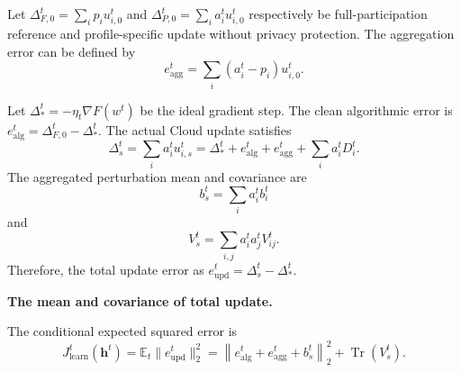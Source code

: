 \documentclass[5p,times]{elsarticle}
\theoremstyle{plain}
\theoremstyle{definition}
\theoremstyle{remark}
\begin{document}
Let \(\Delta_{F,0}^t=\sum_i p_i u_{i,0}^t\)
and
\(\Delta_{P,0}^t=\sum_i a_i^t u_{i,0}^t\) respectively be 
full-participation reference and 
profile-specific update
without privacy protection.
The aggregation error can be defined by
\begin{equation}
e_{\mathrm{agg}}^t
=
\sum_i(a_i^t-p_i)u_{i,0}^t.
\label{eq:aggregation_error}
\end{equation}


Let \(\Delta_*^t=-\eta_t\nabla F(w^t)\)
be the ideal gradient step.
The clean algorithmic error is
\(e_{\mathrm{alg}}^t
=\Delta_{F,0}^t-\Delta_*^t\).
The actual Cloud update satisfies
\begin{equation}
\Delta_s^t
=
\sum_i a_i^t u_{i,s}^t
=
\Delta_*^t
+
e_{\mathrm{alg}}^t
+
e_{\mathrm{agg}}^t
+
\sum_i a_i^tD_i^t.
\label{eq:actual_cloud_update}
\end{equation}
The aggregated perturbation mean and
covariance are
\begin{equation}
    b_s^t=\sum_i a_i^t b_i^t
\end{equation}
and
\begin{equation}
    V_s^t=\sum_{i,j}a_i^ta_j^tV_{ij}^t.
\end{equation}
Therefore,
the total update error as
\(e_{\mathrm{upd}}^t=\Delta_s^t-\Delta_*^t\).

\textbf{The mean and covariance of total update.}\ 

The conditional expected squared error is
\begin{equation}
J_{\mathrm{learn}}^t(\mathbf h^t)
=
\mathbb E_t\|e_{\mathrm{upd}}^t\|_2^2
=
\left\|
e_{\mathrm{alg}}^t+
e_{\mathrm{agg}}^t+b_s^t
\right\|_2^2
+
\operatorname{Tr}(V_s^t).
\label{eq:j_learn_exact}
\end{equation}
\end{document}
